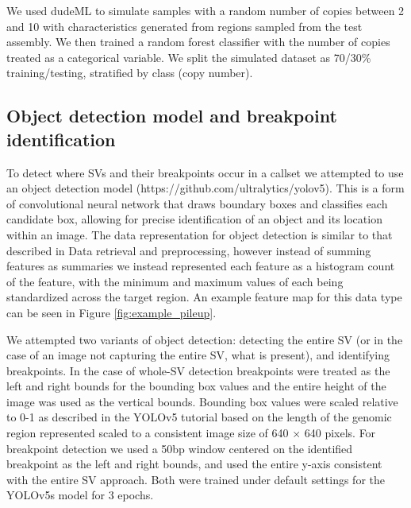 We used dudeML \cite{hillDeepLearningApproach2019} to simulate samples with a random number of copies between 2 and 10 with characteristics generated from regions sampled from the test assembly. We then trained a random forest classifier with the number of copies treated as a categorical variable. We split the simulated dataset as 70/30\% training/testing, stratified by class (copy number).

\subsection{Object detection model and breakpoint identification}

To detect where SVs and their breakpoints occur in a callset we attempted to use an object detection model (https://github.com/ultralytics/yolov5). This is a form of convolutional neural network that draws boundary boxes and classifies each candidate box, allowing for precise identification of an object and its location within an image. The data representation for object detection is similar to that described in Data retrieval and preprocessing, however instead of summing features as summaries we instead represented each feature as a histogram count of the feature, with the minimum and maximum values of each being standardized across the target region. An example feature map for this data type can be seen in Figure \ref{fig:example_pileup}. 

We attempted two variants of object detection: detecting the entire SV (or in the case of an image not capturing the entire SV, what is present), and identifying breakpoints. In the case of whole-SV detection breakpoints were treated as the left and right bounds for the bounding box values and the entire height of the image was used as the vertical bounds. Bounding box values were scaled relative to 0-1 as described in the YOLOv5 tutorial based on the length of the genomic region represented scaled to a consistent image size of 640 $\times$ 640 pixels. For breakpoint detection we used a 50bp window centered on the identified breakpoint as the left and right bounds, and used the entire y-axis consistent with the entire SV approach. Both were trained under default settings for the YOLOv5s model for 3 epochs.

